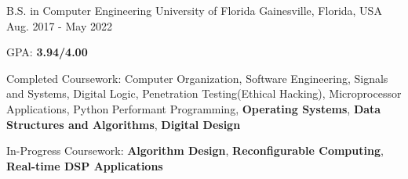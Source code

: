 

\begin{cventries}

  \cventry
    {B.S. in Computer Engineering} %
    {University of Florida} %
    {Gainesville, Florida, USA} %
    {Aug. 2017 - May 2022} %
    {
      \begin{cvitems} %
        \item {GPA: \textbf{3.94/4.00}}
        \item {Completed Coursework: Computer Organization, Software Engineering, Signals and Systems, Digital Logic,  Penetration Testing(Ethical Hacking), Microprocessor Applications, Python Performant Programming, \textbf{Operating Systems}, \textbf{Data Structures and Algorithms}, \textbf{Digital Design}}
        \item {In-Progress Coursework: \textbf{Algorithm Design}, \textbf{Reconfigurable Computing}, \textbf{Real-time DSP Applications}}
      \end{cvitems}
    }

\end{cventries}
